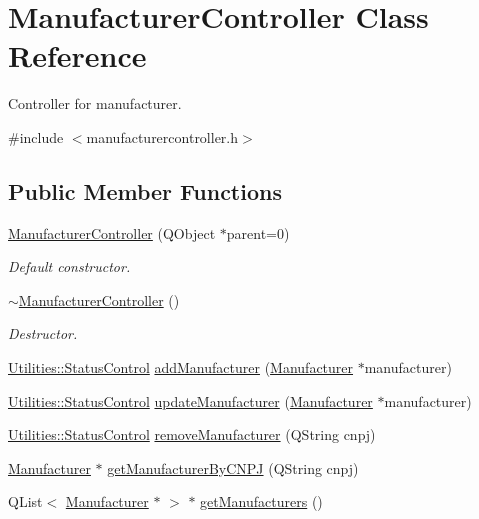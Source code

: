 \hypertarget{class_manufacturer_controller}{\section{\-Manufacturer\-Controller \-Class \-Reference}
\label{class_manufacturer_controller}
}


\-Controller for manufacturer.  




{\ttfamily \#include $<$manufacturercontroller.\-h$>$}

\subsection*{\-Public \-Member \-Functions}
\begin{DoxyCompactItemize}
\item 
\hyperlink{class_manufacturer_controller_ae8d6561bbc03b036bb2f8ba6eb4ccdce}{\-Manufacturer\-Controller} (\-Q\-Object $\ast$parent=0)
\begin{DoxyCompactList}\small\item\em \-Default constructor. \end{DoxyCompactList}\item 
\hyperlink{class_manufacturer_controller_aecc04a81e98ad2702d640080d148a874}{$\sim$\-Manufacturer\-Controller} ()
\begin{DoxyCompactList}\small\item\em \-Destructor. \end{DoxyCompactList}\item 
\hyperlink{class_utilities_a2974f062d85bdb0c444a1cbe554bf228}{\-Utilities\-::\-Status\-Control} \hyperlink{class_manufacturer_controller_a9eebc91527aa1e0367c3113f2f9f5edb}{add\-Manufacturer} (\hyperlink{class_manufacturer}{\-Manufacturer} $\ast$manufacturer)
\item 
\hyperlink{class_utilities_a2974f062d85bdb0c444a1cbe554bf228}{\-Utilities\-::\-Status\-Control} \hyperlink{class_manufacturer_controller_aeaa8d5409e8bcf5bc74700c4ddc2fc22}{update\-Manufacturer} (\hyperlink{class_manufacturer}{\-Manufacturer} $\ast$manufacturer)
\item 
\hyperlink{class_utilities_a2974f062d85bdb0c444a1cbe554bf228}{\-Utilities\-::\-Status\-Control} \hyperlink{class_manufacturer_controller_abd8e03eb4d4d5dac62fb22f06a100e68}{remove\-Manufacturer} (\-Q\-String cnpj)
\item 
\hyperlink{class_manufacturer}{\-Manufacturer} $\ast$ \hyperlink{class_manufacturer_controller_ab9d81016524a8124812673088aaea1fe}{get\-Manufacturer\-By\-C\-N\-P\-J} (\-Q\-String cnpj)
\item 
\-Q\-List$<$ \hyperlink{class_manufacturer}{\-Manufacturer} $\ast$ $>$ $\ast$ \hyperlink{class_manufacturer_controller_ac0cb4ccd13d0fa4ab766b54cdae70d9e}{get\-Manufacturers} ()
\end{DoxyCompactItemize}


